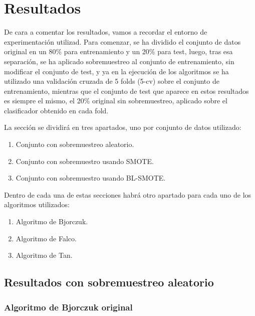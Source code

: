 \section{Resultados} \label{resultados}

De cara a comentar los resultados, vamos a recordar el entorno de experimentación utilizad. Para comenzar, se ha dividido el conjunto de datos original en un 80\% para entrenamiento y un 20\% para test, luego, tras esa separación, se ha aplicado sobremuestreo al conjunto de entrenamiento, sin modificar el conjunto de test, y ya en la ejecución de los algoritmos se ha utilizado una validación cruzada de 5 folds (5-cv) sobre el conjunto de entrenamiento, mientras que el conjunto de test que aparece en estos resultados es siempre el mismo, el 20\% original sin sobremuestreo, aplicado sobre el clasificador obtenido en cada fold.

La sección se dividirá en tres apartados, uno por conjunto de datos utilizado:

\begin{enumerate}
	\item Conjunto con sobremuestreo aleatorio.
	\item Conjunto con sobremuestro usando SMOTE.
	\item Conjunto con sobremuestro usando BL-SMOTE.
\end{enumerate}

Dentro de cada una de estas secciones habrá otro apartado para cada uno de los algoritmos utilizados:

\begin{enumerate}
	\item Algoritmo de Bjorczuk.
	\item Algoritmo de Falco.
	\item Algoritmo de Tan.
\end{enumerate}

\subsection{Resultados con sobremuestreo aleatorio}

\subsubsection{Algoritmo de Bjorczuk original}


